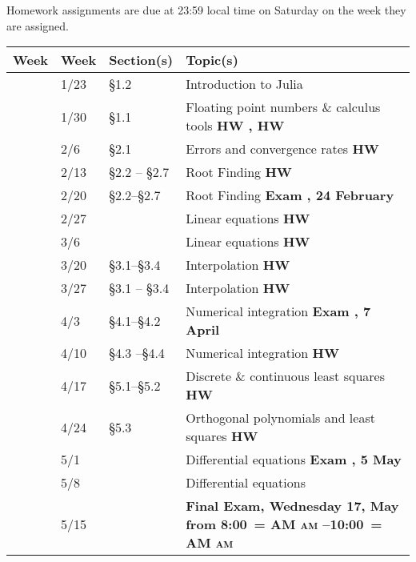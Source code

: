 \documentclass[12pt,fullpage]{article}
\makeatletter
\newcounter{qz}\setcounter{qz}{0}
\newcommand{\qz}{\setcounter{qz}{\value{qz}+1}\textbf{ \theqz}}
\newcounter{ex}\setcounter{ex}{0}
\newcommand{\ex}{%
\setcounter{ex}{\value{ex}+1}
Exam \theex}
\newcounter{wk}\setcounter{wk}{0}
\newcommand{\wk}{%
\setcounter{wk}{\value{wk}+1}
\thewk \,\,}
\DeclareRobustCommand{\maybefakesc}[1]{%
  \ifnum\pdfstrcmp{\f@series}{\bfdefault}=\z@
    {\fontsize{\dimexpr0.8\dimexpr\f@size pt\relax}{0}\selectfont\uppercase{#1}}%
  \else
    \textsc{#1}%
  \fi
}
\newcommand\AM{\,\maybefakesc{am}\xspace}
\newcommand{\finaldateandtime}{Wednesday 17, May  from 8:00\AM{}--10:00\AM}
\makeatother
\begin{document}
 Homework assignments are due at 23:59 local time on Saturday on the week they are assigned. 
 
 \vspace{0.1in}
 
 \begin{center}
 
 \begin{tabular}  {|l|l|l|l|}
 \hline
 {\bf Week}  & {\bf Week} &  {\bf Section(s)} & {\bf Topic(s)} \\
 \hline \hline 
 \wk    & 1/23 &    \S1.2   &   Introduction to Julia   \hfill \\
 \wk    & 1/30 & \S1.1      &  Floating point numbers \& calculus tools   \hfill \textbf{HW  \qz,  HW \qz} \\
 \wk    & 2/6 &    \S2.1 & Errors and convergence rates    \hfill \textbf{HW  \qz} \\
 \wk    & 2/13  & \S2.2 -- \S2.7 &  Root Finding   \hfill  \textbf{HW \qz} \\
 \wk    & 2/20 &  \S2.2--\S2.7   &  Root Finding    \hfill \textbf{\ex\-\-, 24 February}   \\
 \wk    & 2/27    &  &  Linear equations  \hfill  \textbf{HW  \qz }  \\
 \wk    & 3/6    &  &  Linear equations  \hfill  \textbf{HW  \qz }  \\
 \wk    & 3/20     & \S3.1--\S3.4 & Interpolation \hfill \textbf{ HW  \qz }   \\
 \wk    & 3/27   & \S3.1 -- \S3.4   &   Interpolation   \hfill \textbf{ HW  \qz} \\
 \wk    & 4/3   & \S4.1--\S4.2 &  Numerical  integration  \hfill \textbf{\ex\-\-, 7 April} \\
 \wk    & 4/10    &   \S4.3 --\S4.4 &   Numerical integration    \hfill  \textbf{ HW  \qz} \\
 \wk    & 4/17 &   \S5.1--\S5.2 & Discrete \& continuous least squares  \hfill \textbf{HW    \qz} \\
 \wk    & 4/24  & \S5.3 &  Orthogonal polynomials and least squares  \hfill \textbf{HW \qz}   \\
 \wk    & 5/1  &   & Differential equations \hfill  \textbf{ \ex\-\-\-, 5 May}     \\
 \wk    & 5/8  &     & Differential equations   \hfill \\
 \wk    & 5/15       &  &   \textbf{Final Exam, \finaldateandtime} \\ \hline
 \end{tabular}
 \end{center}
 
\end{document}
